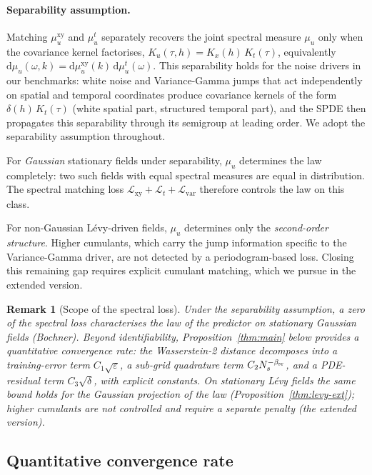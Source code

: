 \documentclass[10pt]{elsarticle}
\newtheorem{remark}{Remark}
\begin{document}
\paragraph{Separability assumption.}
Matching \(\mu^{\mathrm{xy}}_u\) and \(\mu^t_u\) separately
recovers the joint spectral measure \(\mu_u\) only when the
covariance kernel factorises, \(K_u(\tau, h) = K_x(h)\, K_t(\tau)\),
equivalently \(\mathrm d\mu_u(\omega, k) = \mathrm d\mu^{\mathrm{xy}}_u(k)\,
\mathrm d\mu^t_u(\omega)\). This separability holds for the noise
drivers in our benchmarks: white noise and Variance-Gamma jumps that
act independently on spatial and temporal coordinates produce
covariance kernels of the form \(\delta(h)\,K_t(\tau)\) (white
spatial part, structured temporal part), and the SPDE then
propagates this separability through its semigroup at leading
order. We adopt the separability assumption throughout.

For \emph{Gaussian} stationary fields under separability,
\(\mu_u\) determines the law completely: two such fields with
equal spectral measures are equal in distribution. The spectral
matching loss
\(\mathcal L_{\mathrm{xy}} + \mathcal L_t + \mathcal L_{\mathrm{var}}\)
therefore controls the law on this class.

For non-Gaussian L\'evy-driven fields, \(\mu_u\) determines only
the \emph{second-order structure}. Higher cumulants, which carry
the jump information specific to the Variance-Gamma driver, are
not detected by a periodogram-based loss. Closing this remaining
gap requires explicit cumulant matching, which we pursue in
the extended version.

\begin{remark}[Scope of the spectral loss]
\label{rem:scope}
Under the separability assumption, a zero of the spectral loss
characterises the law of the predictor on stationary Gaussian fields
(Bochner). Beyond identifiability, Proposition~\ref{thm:main} below
provides a quantitative convergence rate: the Wasserstein-2 distance
decomposes into a training-error term \(C_1\sqrt{\varepsilon}\), a
sub-grid quadrature term \(C_2 N_s^{-\beta_{\rm sr}}\), and a PDE-residual
term \(C_3\sqrt{\delta}\), with explicit constants. On stationary
L\'evy fields the same bound holds for the Gaussian projection of the
law (Proposition~\ref{thm:levy-ext}); higher cumulants are not controlled
and require a separate penalty (the extended version).
\end{remark}

\subsection{Quantitative convergence rate}
\label{subsec:convergence}
\end{document}

